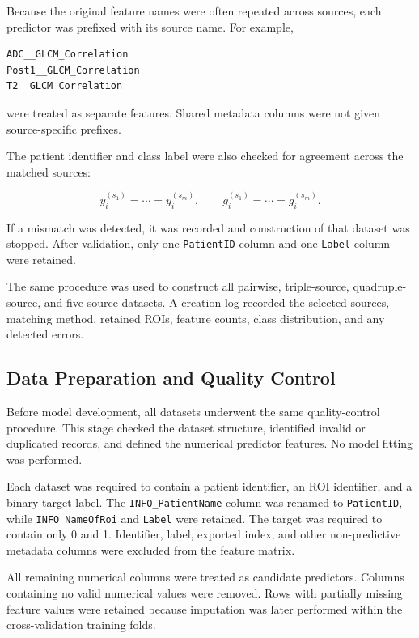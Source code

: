 \documentclass[12pt,twocolumn]{article}
\begin{document}
Because the original feature names were often repeated across sources,
each predictor was prefixed with its source name. For example,

\begin{verbatim}
ADC__GLCM_Correlation
Post1__GLCM_Correlation
T2__GLCM_Correlation
\end{verbatim}

were treated as separate features. Shared metadata columns were not
given source-specific prefixes.

The patient identifier and class label were also checked for agreement
across the matched sources:

\begin{equation}
y_i^{(s_1)}=\cdots=y_i^{(s_m)},
\qquad
g_i^{(s_1)}=\cdots=g_i^{(s_m)}.
\label{eq:multisource_consistency}
\end{equation}

If a mismatch was detected, it was recorded and construction of that
dataset was stopped. After validation, only one \texttt{PatientID}
column and one \texttt{Label} column were retained.

The same procedure was used to construct all pairwise, triple-source,
quadruple-source, and five-source datasets. A creation log recorded
the selected sources, matching method, retained ROIs, feature counts,
class distribution, and any detected errors.





\subsection{Data Preparation and Quality Control}
\label{subsec:data_quality_control}

Before model development, all datasets underwent the same
quality-control procedure. This stage checked the dataset structure,
identified invalid or duplicated records, and defined the numerical
predictor features. No model fitting was performed.

Each dataset was required to contain a patient identifier, an ROI
identifier, and a binary target label. The
\texttt{INFO\_PatientName} column was renamed to
\texttt{PatientID}, while \texttt{INFO\_NameOfRoi} and
\texttt{Label} were retained. The target was required to contain only
0 and 1. Identifier, label, exported index, and other non-predictive
metadata columns were excluded from the feature matrix.

All remaining numerical columns were treated as candidate predictors.
Columns containing no valid numerical values were removed. Rows with
partially missing feature values were retained because imputation was
later performed within the cross-validation training folds.
\end{document}
